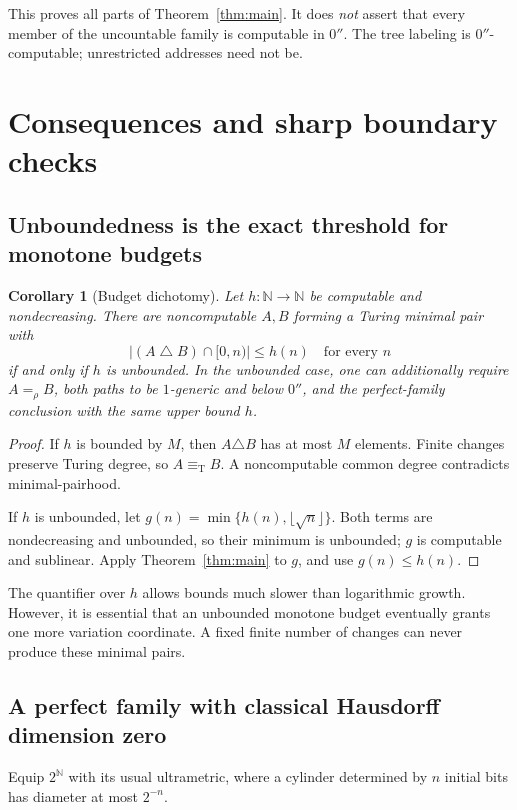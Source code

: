\documentclass[11pt,a4paper]{article}
\newcommand{\N}{\mathbb N}
\newcommand{\Cantor}{2^{\N}}
\newcommand{\eqT}{\equiv_{\mathrm T}}
\newtheorem{corollary}[theorem]{Corollary}
\theoremstyle{definition}\newtheorem{definition}[theorem]{Definition}
\theoremstyle{remark}\newtheorem{remark}[theorem]{Remark}
\begin{document}
This proves all parts of Theorem~\ref{thm:main}. It does \emph{not} assert that
every member of the uncountable family is computable in $0''$. The tree
labeling is $0''$-computable; unrestricted addresses need not be.

\section{Consequences and sharp boundary checks}
\label{sec:boundaries}

\subsection{Unboundedness is the exact threshold for monotone budgets}
\begin{corollary}[Budget dichotomy]\label{cor:dichotomy}
Let $h:\N\to\N$ be computable and nondecreasing. There are noncomputable
$A,B$ forming a Turing minimal pair with
\[
             |(A\mathbin\triangle B)\cap[0,n)|\le h(n)
                         \quad\text{for every }n
\]
if and only if $h$ is unbounded. In the unbounded case, one can additionally
require $A=_{\rho}B$, both paths to be $1$-generic and below $0''$, and the
perfect-family conclusion with the same upper bound $h$.
\end{corollary}
\begin{proof}
If $h$ is bounded by $M$, then $A\triangle B$ has at most $M$ elements.
Finite changes preserve Turing degree, so $A\eqT B$. A noncomputable common
degree contradicts minimal-pairhood.

If $h$ is unbounded, let
$g(n)=\min\{h(n),\lfloor\sqrt n\rfloor\}$.
Both terms are nondecreasing and unbounded, so their minimum is unbounded;
$g$ is computable and sublinear. Apply Theorem~\ref{thm:main} to $g$, and
use $g(n)\le h(n)$.
\end{proof}

The quantifier over $h$ allows bounds much slower than logarithmic growth.
However, it is essential that an unbounded monotone budget eventually grants
one more variation coordinate. A fixed finite number of changes can never
produce these minimal pairs.

\subsection{A perfect family with classical Hausdorff dimension zero}
Equip $\Cantor$ with its usual ultrametric, where a cylinder determined by
$n$ initial bits has diameter at most $2^{-n}$.
\end{document}
